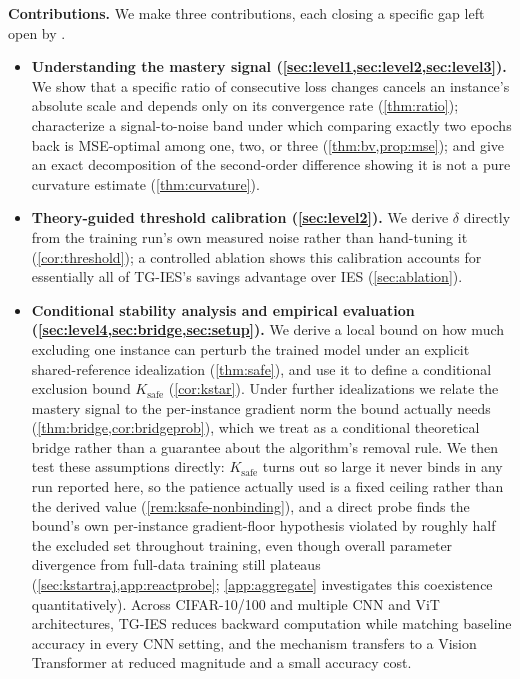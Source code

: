 \documentclass{article}
\theoremstyle{plain}
\theoremstyle{definition}
\theoremstyle{remark}
\begin{document}
\textbf{Contributions.} We make three contributions, each closing a specific gap left open by \citet{yuan2025instance}.
\begin{itemize}[leftmargin=*,itemsep=1pt,topsep=2pt]
\item \textbf{Understanding the mastery signal (\cref{sec:level1,sec:level2,sec:level3}).} We show that a specific ratio of consecutive loss changes cancels an instance's absolute scale and depends only on its convergence rate (\cref{thm:ratio}); characterize a signal-to-noise band under which comparing exactly two epochs back is MSE-optimal among one, two, or three (\cref{thm:bv,prop:mse}); and give an exact decomposition of the second-order difference showing it is not a pure curvature estimate (\cref{thm:curvature}).
\item \textbf{Theory-guided threshold calibration (\cref{sec:level2}).} We derive $\delta$ directly from the training run's own measured noise rather than hand-tuning it (\cref{cor:threshold}); a controlled ablation shows this calibration accounts for essentially all of TG-IES's savings advantage over IES (\cref{sec:ablation}).
\item \textbf{Conditional stability analysis and empirical evaluation (\cref{sec:level4,sec:bridge,sec:setup}).} We derive a local bound on how much excluding one instance can perturb the trained model under an explicit shared-reference idealization (\cref{thm:safe}), and use it to define a conditional exclusion bound $K_{\mathrm{safe}}$ (\cref{cor:kstar}). Under further idealizations we relate the mastery signal to the per-instance gradient norm the bound actually needs (\cref{thm:bridge,cor:bridgeprob}), which we treat as a conditional theoretical bridge rather than a guarantee about the algorithm's removal rule. We then test these assumptions directly: $K_{\mathrm{safe}}$ turns out so large it never binds in any run reported here, so the patience actually used is a fixed ceiling rather than the derived value (\cref{rem:ksafe-nonbinding}), and a direct probe finds the bound's own per-instance gradient-floor hypothesis violated by roughly half the excluded set throughout training, even though overall parameter divergence from full-data training still plateaus (\cref{sec:kstartraj,app:reactprobe}; \cref{app:aggregate} investigates this coexistence quantitatively). Across CIFAR-10/100 and multiple CNN and ViT architectures, TG-IES reduces backward computation while matching baseline accuracy in every CNN setting, and the mechanism transfers to a Vision Transformer at reduced magnitude and a small accuracy cost.
\end{itemize}
\end{document}

